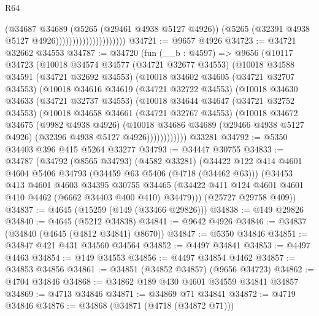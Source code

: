 \begin{lexlean}{R64}
\begin{coremodule}
                                        (@34687
                                          @34689
                                          (@5265 (@29461 @4938 @5127 @4926))
                                          (@5265 (@32391 @4938 @5127 @4926)))))))))))))))))))))
@34721 := @9657 @4926
@34723 := @34721 @32662 @34553
@34787 := @34720
    (fun (__b : @4597) =>
    @9656
      (@10117
        @34723
        (@10018
          @34574
          @34577
          (@34721 @32677 @34553)
          (@10018
            @34588
            @34591
            (@34721 @32692 @34553)
            (@10018
              @34602
              @34605
              (@34721 @32707 @34553)
              (@10018
                @34616
                @34619
                (@34721 @32722 @34553)
                (@10018
                  @34630
                  @34633
                  (@34721 @32737 @34553)
                  (@10018
                    @34644
                    @34647
                    (@34721 @32752 @34553)
                    (@10018
                      @34658
                      @34661
                      (@34721 @32767 @34553)
                      (@10018
                        @34672
                        @34675
                        (@9982 @4938 @4926)
                        (@10018
                          @34686
                          @34689
                          (@29466 @4938 @5127 @4926)
                          (@32396 @4938 @5127 @4926))))))))))))
    @33281
@34792 := @5350 @34403 @396 @415 @5264 @33277
@34793 := @34447 @30755
@34833 := @34787
    (@34792
      (@8565 @34793)
      (@4582 @33281)
      (@34422
        @122
        @414
        @4601
        @4604
        @5406
        @34793
        (@34459 @63 @5406 (@4718 (@34462 @63)))
        (@34453
          @413
          @4601
          @4603
          @34395
          @30755
          @34465
          (@34422 @411 @124 @4601 @4601 @410 @4462 (@6662 @34403 @400 @410) @34479)))
      (@25727 @29758 @409))
@34837 := @4645 (@15259 (@149 (@33466 @29826)))
@34838 := @149 @29826
@34840 := @4645 (@5212 @34838)
@34841 := @9642 @4926
@34846 := @34837 (@34840 (@4645 (@4812 @34841) @8670))
@34847 := @5350 @34846
@34851 := @34847 @421 @431 @34560 @34564
@34852 := @4497 @34841
@34853 := @4497 @4463
@34854 := @149 @34553
@34856 := @4497 @34854 @4462
@34857 := @34853 @34856
@34861 := @34851 (@34852 @34857) (@9656 @34723)
@34862 := @4704 @34846
@34868 := @34862 @189 @430 @4601 @34559 @34841 @34857
@34869 := @4713 @34846
@34871 := @34869 @71 @34841
@34872 := @4719 @34846
@34876 := @34868 (@34871 (@4718 (@34872 @71)))

\end{coremodule}
\end{lexlean}
